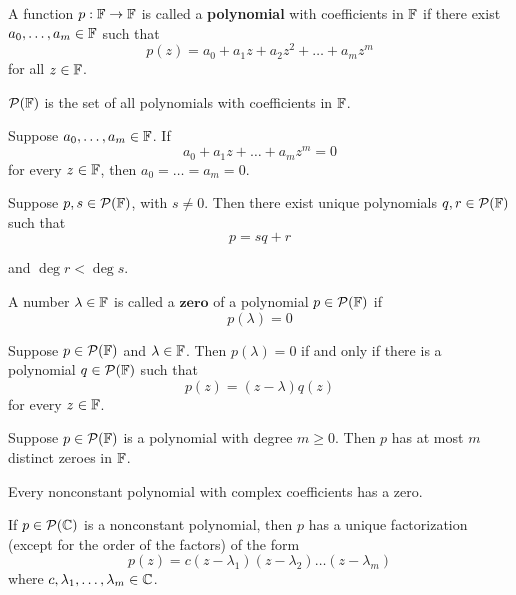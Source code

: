 \begin{definition} [Polynomial]
    A function $p: \operatorname{\mathbb{F}} \to \operatorname{\mathbb{F}}$ is called a \textbf{polynomial} with
    coefficients in $\operatorname{\mathbb{F}}$ if there exist $a_0, \dots, a_m \in \operatorname{\mathbb{F}}$ such that
    \[ p(z) = a_0 + a_1 z + a_2 z^2 + \dots + a_m z^m \]
    for all $z \in \operatorname{\mathbb{F}}$.

    $\mathcal{P}(\operatorname{\mathbb{F}})$ is the set of all polynomials with coefficients in $\operatorname{\mathbb{F}}$.
\end{definition}

\begin{theorem} 
    Suppose $a_0, \dots, a_m \in \operatorname{\mathbb{F}}$. If
    \[ a_0 + a_1 z + \dots + a_m z^m = 0 \]
    for every $z \in \operatorname{\mathbb{F}}$, then $a_0 = \dots = a_m = 0$.
\end{theorem}

\begin{theorem} 
    Suppose $p, s \in \mathcal{P}(\operatorname{\mathbb{F}})$, with $s \neq 0$. Then there exist unique
    polynomials $q, r \in \mathcal{P}(\operatorname{\mathbb{F}})$ such that
    \[ p = sq + r \]

    and $\deg{r} < \deg{s}$.
\end{theorem}

\begin{definition} 
    A number $\lambda \in \operatorname{\mathbb{F}}$ is called a $\textbf{zero}$ of a polynomial
    $p \in \mathcal{P}(\operatorname{\mathbb{F}})$ if
    \[ p(\lambda) = 0 \]
\end{definition}

\begin{theorem} 
    Suppose $p \in \mathcal{P}(\operatorname{\mathbb{F}})$ and $\lambda \in \operatorname{\mathbb{F}}$. Then
    $p(\lambda) = 0$ if and only if there is a polynomial $q \in \mathcal{P}(\operatorname{\mathbb{F}})$ such that
    \[ p(z) = (z - \lambda)q(z) \]
    for every $z \in \operatorname{\mathbb{F}}$.
\end{theorem}

\begin{theorem} 
    Suppose $p \in \mathcal{P}(\operatorname{\mathbb{F}})$ is a polynomial with degree $m \geq 0$. Then $p$ has at most
    $m$ distinct zeroes in $\operatorname{\mathbb{F}}$.
\end{theorem}

\begin{theorem} 
    Every nonconstant polynomial with complex coefficients has a zero.
\end{theorem}

\begin{theorem} 
    If $p \in \mathcal{P}(\operatorname{\mathbb{C}})$ is a nonconstant polynomial, then $p$ has a unique
    factorization (except for the order of the factors) of the form
    \[ p(z) = c(z - \lambda_1)(z - \lambda_2) \dots (z - \lambda_m) \]
    where $c, \lambda_1, \dots, \lambda_m \in \operatorname{\mathbb{C}}$.
\end{theorem}

